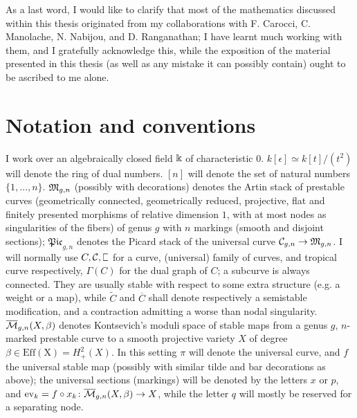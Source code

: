 As a last word, I would like to clarify that most of the mathematics discussed within this thesis originated from my collaborations with F. Carocci, C. Manolache, N. Nabijou, and D. Ranganathan; I have learnt much working with them, and I gratefully acknowledge this, while the exposition of the material presented in this thesis (as well as any mistake it can possibly contain) ought to be ascribed to me alone.

\section*{Notation and conventions}
I work over an algebraically closed field $\Bbbk$ of characteristic $0$. $k[\epsilon]\simeq k[t]/(t^2)$ will denote the ring of dual numbers. $[n]$ will denote the set of natural numbers $\{1,\ldots,n\}$. $\mathfrak M_{g,n}$ (possibly with decorations) denotes the Artin stack of prestable curves (geometrically connected, geometrically reduced, projective, flat and finitely presented morphisms of relative dimension $1$, with at most nodes as singularities of the fibers) of genus $g$ with $n$ markings (smooth and disjoint sections); $\mathfrak{Pic}_{g,n}$ denotes the Picard stack of the universal curve $\mathcal C_{g,n}\rightarrow\mathfrak M_{g,n}$. I will normally use $C,\mathcal C,\plC$ for a curve, (universal) family of curves, and tropical curve respectively, $\Gamma(C)$ for the dual graph of $C$; a subcurve is always connected. They are usually stable with respect to some extra structure (e.g. a weight or a map), while $\widetilde{C}$ and $\overline{C}$ shall denote respectively a semistable modification, and a contraction admitting a worse than nodal singularity. $\overline{\mathcal{M}}_{g,n}(X,\beta)$ denotes Kontsevich's moduli space of stable maps from a genus $g$, $n$-marked prestable curve to a smooth projective variety $X$ of degree $\beta\in\operatorname{Eff(X)}=H^2_+(X)$. In this setting $\pi$ will denote the universal curve, and $f$ the universal stable map (possibly with similar tilde and bar decorations as above); the universal sections (markings) will be denoted by the letters $x$ or $p$, and $\operatorname{ev}_k=f\circ x_k\colon \overline{\mathcal{M}}_{g,n}(X,\beta)\rightarrow X$, while the letter $q$ will mostly be reserved for a separating node.
